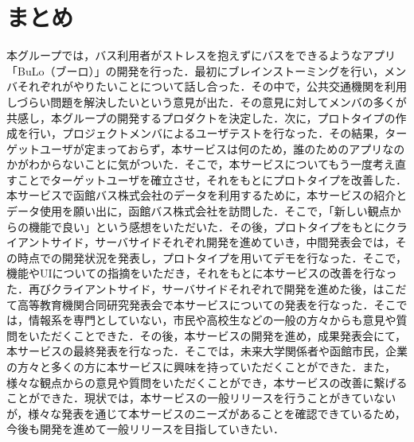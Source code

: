 \chapter{まとめ}
本グループでは，バス利用者がストレスを抱えずにバスをできるようなアプリ「BuLo（ブーロ）」の開発を行った．最初にブレインストーミングを行い，メンバそれぞれがやりたいことについて話し合った．その中で，公共交通機関を利用しづらい問題を解決したいという意見が出た．その意見に対してメンバの多くが共感し，本グループの開発するプロダクトを決定した．次に，プロトタイプの作成を行い，プロジェクトメンバによるユーザテストを行なった．その結果，ターゲットユーザが定まっておらず，本サービスは何のため，誰のためのアプリなのかがわからないことに気がついた．そこで，本サービスについてもう一度考え直すことでターゲットユーザを確立させ，それをもとにプロトタイプを改善した．本サービスで函館バス株式会社のデータを利用するために，本サービスの紹介とデータ使用を願い出に，函館バス株式会社を訪問した．そこで，「新しい観点からの機能で良い」という感想をいただいた．その後，プロトタイプをもとにクライアントサイド，サーバサイドそれぞれ開発を進めていき，中間発表会では，その時点での開発状況を発表し，プロトタイプを用いてデモを行なった．そこで，機能やUIについての指摘をいただき，それをもとに本サービスの改善を行なった．再びクライアントサイド，サーバサイドそれぞれで開発を進めた後，はこだて高等教育機関合同研究発表会で本サービスについての発表を行なった．そこでは，情報系を専門としていない，市民や高校生などの一般の方々からも意見や質問をいただくことできた．その後，本サービスの開発を進め，成果発表会にて，本サービスの最終発表を行なった．そこでは，未来大学関係者や函館市民，企業の方々と多くの方に本サービスに興味を持っていただくことができた．また，様々な観点からの意見や質問をいただくことができ，本サービスの改善に繋げることができた．現状では，本サービスの一般リリースを行うことがきていないが，様々な発表を通じて本サービスのニーズがあることを確認できているため，今後も開発を進めて一般リリースを目指していきたい．
